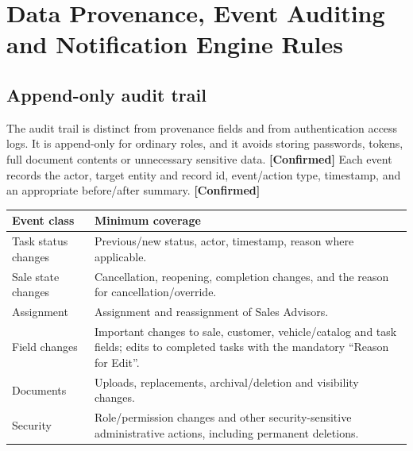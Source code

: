 \documentclass[11pt,a4paper]{article}
\newcommand{\tagconf}{\textcolor{green!45!black}{\textbf{[Confirmed]}}}
\begin{document}
\section{Data Provenance, Event Auditing and Notification Engine Rules}

\subsection{Append-only audit trail}\label{sec:audit}

The audit trail is distinct from provenance fields and from authentication access logs. It is append-only for ordinary roles, and it avoids storing passwords, tokens, full document contents or unnecessary sensitive data. \tagconf{} Each event records the actor, target entity and record id, event/action type, timestamp, and an appropriate before/after summary. \tagconf{}

\begin{longtable}{@{}L{4.4cm}L{11.4cm}@{}}
	\toprule
	\textbf{Event class} & \textbf{Minimum coverage}                                                                                                              \\
	\midrule
	\endhead
	Task status changes  & Previous/new status, actor, timestamp, reason where
	applicable.                                                                                                                                                   \\
	Sale state changes   & Cancellation, reopening, completion changes, and the reason for cancellation/override.                                                 \\
	Assignment           & Assignment and reassignment of Sales Advisors.                                                                                         \\
	Field changes        & Important changes to sale, customer, vehicle/catalog and task fields; edits to completed tasks with the mandatory ``Reason for Edit''. \\
	Documents            & Uploads, replacements, archival/deletion and visibility changes.                                                                       \\
	Security             & Role/permission changes and other security-sensitive administrative actions, including permanent deletions.                            \\
	\bottomrule
\end{longtable}
\end{document}
